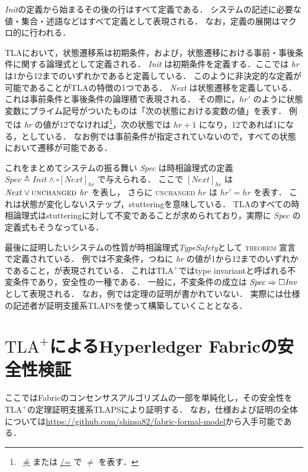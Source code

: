 \documentclass{fose2019}           %
\newcommand{\TLA}{$\text{TLA}^{+}$}
\begin{document}
\textit{Init}の定義から始まるその後の行はすべて定義である．
システムの記述に必要な値・集合・述語などはすべて定義として表現される．
なお，定義の展開はマクロ的に行われる．

TLAにおいて，状態遷移系は初期条件，および，状態遷移における事前・事後条件に関する論理式として定義される．
\textit{Init} は初期条件を定義する．ここでは \textit{hr} は1から12までのいずれかであると定義している．
このように非決定的な定義が可能であることがTLAの特徴の1つである．
\textit{Next} は状態遷移を定義している．これは事前条件と事後条件の論理積で表現される．
その際に，$\mathit{hr}'$ のように状態変数にプライム記号がついたものは「次の状態における変数の値」を表す．
例では \textit{hr} の値が12でなければ\footnote{~\url{#} または \url{/=} で $\neq$ を表す．}，次の状態では $\mathit{hr}+1$ になり，12であれば1になる，としている．
なお例では事前条件が指定されていないので，すべての状態において遷移が可能である．

これをまとめてシステムの振る舞い \textit{Spec} は時相論理式の定義 $\mathit{Spec} \triangleq \mathit{Init} \land {\square [ \mathit{Next} ]_{\mathit{hr}} }$ で与えられる．
ここで $[ \mathit{Next} ]_{\mathit{hr}}$ は $ \mathit{Next} \lor \textsc{unchanged $\mathit{hr}$}$ を表し，
さらに \textsc{unchanged} $\mathit{hr}$ は $\mathit{hr}' = \mathit{hr}$ を表す．
これは状態が変化しないステップ，stutteringを意味している．
TLAのすべての時相論理式はstutteringに対して不変であることが求められており，実際に \textit{Spec} の定義式もそうなっている．

最後に証明したいシステムの性質が時相論理式\textit{TypeSafety}として \textsc{theorem} 宣言で定義されている．
例では不変条件，つねに \textit{hr} の値が1から12までのいずれかであること，が表現されている．
これは\TLA ではtype invariantと呼ばれる不変条件であり，安全性の一種である．
一般に，不変条件の成立は $\mathit{Spec} \Rightarrow \square \mathit{Inv}$ として表現される．
なお，例では定理の証明が書かれていない．
実際には仕様の記述者が証明支援系TLAPSを使って構築していくこととなる．

\section{\TLA によるHyperledger Fabricの安全性検証}
\label{sec:verification}

ここではFabricのコンセンサスアルゴリズムの一部を単純化し，その安全性を\TLA の定理証明支援系TLAPSにより証明する．
なお，仕様および証明の全体については\url{https://github.com/shinsa82/fabric-formal-model}から入手可能である．
\end{document}
